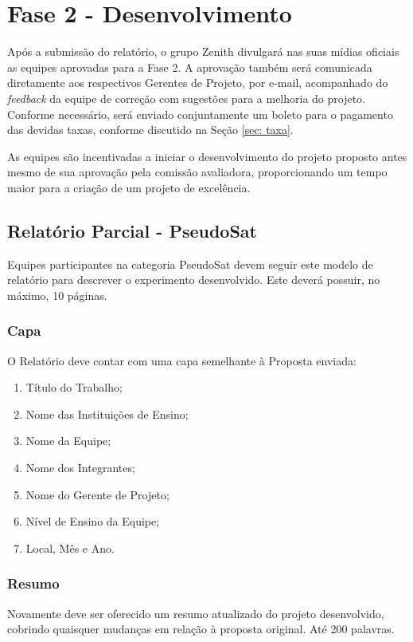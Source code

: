 \section{Fase 2 - Desenvolvimento}
    Após a submissão do relatório, o grupo Zenith divulgará nas suas mídias oficiais 
    as equipes aprovadas para a Fase 2. A aprovação também será comunicada 
    diretamente aos respectivos Gerentes de Projeto, por e-mail, acompanhado do 
    \textit{feedback} da equipe de correção com sugestões para a melhoria do projeto. 
    Conforme necessário, será enviado conjuntamente um boleto para o pagamento das devidas
    taxas, conforme discutido na Seção \ref{sec: taxa}.

    As equipes são incentivadas a iniciar o desenvolvimento do projeto proposto antes
    mesmo de sua aprovação pela comissão avaliadora, proporcionando um tempo maior para 
    a criação de um projeto de excelência.
    
    
    \subsection{Relatório Parcial - PseudoSat}
        Equipes participantes na categoria PseudoSat devem seguir este modelo de relatório para descrever o experimento desenvolvido. Este deverá possuir, no máximo, 10 páginas.
        
        \subsubsection{Capa}
            O Relatório deve contar com uma capa semelhante à Proposta enviada:
            \begin{enumerate}
                \item Título do Trabalho; 
                \item Nome das Instituições de Ensino; 
                \item Nome da Equipe; 
                \item Nome dos Integrantes; 
                \item Nome do Gerente de Projeto;
                \item Nível de Ensino da Equipe;
                \item Local, Mês e Ano. 
            \end{enumerate}
                    
        \subsubsection{Resumo}
            Novamente deve ser oferecido um resumo atualizado do projeto desenvolvido, cobrindo quaisquer mudanças em relação à proposta original. Até 200 palavras.


